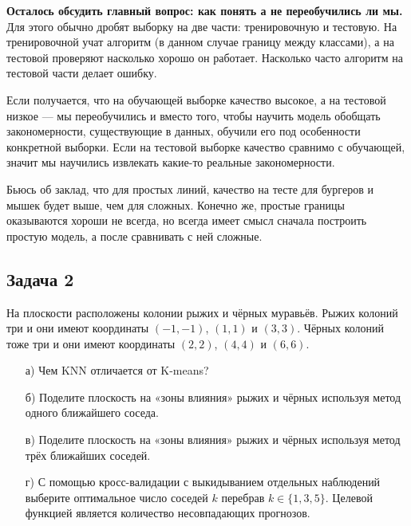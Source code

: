 \documentclass[12pt, a4paper, oneside]{article}
\begin{document}
{ \textbf{Осталось обсудить главный вопрос: как понять а не переобучились ли мы.}  Для этого обычно дробят выборку на две части: тренировочную и тестовую. На тренировочной учат алгоритм (в данном случае границу между классами), а на тестовой проверяют насколько хорошо он работает. Насколько часто алгоритм на тестовой части делает ошибку. 
 
 Если получается, что на обучающей выборке качество высокое, а на тестовой низкое --- мы переобучились и вместо того, чтобы научить модель обобщать закономерности, существующие в данных, обучили его под особенности конкретной выборки.  Если на тестовой выборке качество сравнимо с обучающей, значит мы научились извлекать какие-то реальные закономерности.
 
 Бьюсь об заклад, что для простых линий, качество на тесте для бургеров и мышек будет выше, чем для сложных.  Конечно же, простые границы оказываются хороши не всегда, но всегда имеет смысл сначала построить простую модель, а после сравнивать с ней сложные. 
}


\subsection*{Задача 2}

На плоскости расположены колонии рыжих и чёрных муравьёв. Рыжих колоний три и они имеют координаты $(-1, -1)$, $(1, 1)$ и $(3, 3)$. Чёрных колоний тоже три и они имеют координаты $(2, 2)$, $(4, 4)$ и $(6, 6)$.

\begin{enumerate}
	\item[а)] Чем KNN отличается от K-means? 
	\item[б)] Поделите плоскость на «зоны влияния» рыжих и чёрных используя метод одного ближайшего соседа.
	\item[в)] Поделите плоскость на «зоны влияния» рыжих и чёрных используя метод трёх ближайших соседей.
	\item[г)] С помощью кросс-валидации с выкидыванием отдельных наблюдений выберите оптимальное число соседей $k$ перебрав $k \in \{1, 3, 5\}$. Целевой функцией является количество несовпадающих прогнозов.
\end{enumerate}
\end{document}
